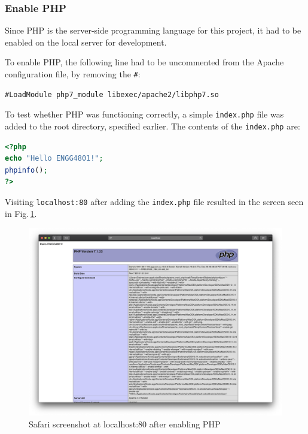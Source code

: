 \documentclass[12pt,openany,a4paper]{book}
\newcommand{\fig}[1]  {Fig.\,\ref{#1}}		%
\begin{document}
\subsubsection{Enable PHP}

Since PHP is the server-side programming language for this project, it had to
be enabled on the local server for development.

To enable PHP, the following line had to be uncommented from the Apache configuration
file, by removing the \verb|#|:

\begin{lstlisting}[basicstyle=\ttfamily,breaklines=true]
#LoadModule php7_module libexec/apache2/libphp7.so
\end{lstlisting}

To test whether PHP was functioning correctly, a simple \verb|index.php| file
was added to the root directory, specified earlier. The contents of the \verb|index.php| are:

\begin{lstlisting}[basicstyle=\ttfamily,breaklines=true,language=PHP]
<?php
echo "Hello ENGG4801!";
phpinfo();
?>
\end{lstlisting}

Visiting \verb|localhost:80| after adding the \verb|index.php| file resulted in
the screen seen in \fig{fig:php_info}.

\begin{figure}[h]
\centerline{\includegraphics[width=\textwidth]{PHPInfo.png}}
\caption{Safari screenshot at localhost:80 after enabling PHP}
\label{fig:php_info}
\end{figure}
\end{document}
